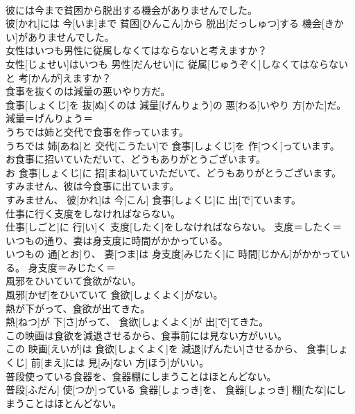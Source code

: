 \documentclass[8pt]{extreport}
\begin{document}
\begin{CJK}{UTF8}{min}
\\	彼には今まで貧困から脱出する機会がありませんでした。	
\\	彼[かれ]には 今[いま]まで 貧困[ひんこん]から 脱出[だっしゅつ]する 機会[きかい]がありませんでした。	
\\	女性はいつも男性に従属しなくてはならないと考えますか？	
\\	女性[じょせい]はいつも 男性[だんせい]に 従属[じゅうぞく]しなくてはならないと 考[かんが]えますか？	
\\	食事を抜くのは減量の悪いやり方だ。	
\\	食事[しょくじ]を 抜[ぬ]くのは 減量[げんりょう]の 悪[わる]いやり 方[かた]だ。	減量＝げんりょう＝ 
\\	うちでは姉と交代で食事を作っています。	
\\	うちでは 姉[あね]と 交代[こうたい]で 食事[しょくじ]を 作[つく]っています。	
\\	お食事に招いていただいて、どうもありがとうございます。	
\\	お 食事[しょくじ]に 招[まね]いていただいて、どうもありがとうございます。	
\\	すみません、彼は今食事に出ています。	
\\	すみません、 彼[かれ]は 今[こん] 食事[しょくじ]に 出[で]ています。	
\\	仕事に行く支度をしなければならない。	
\\	仕事[しごと]に 行[い]く 支度[したく]をしなければならない。	支度＝したく＝ 
\\	いつもの通り、妻は身支度に時間がかかっている。	
\\	いつもの 通[とお]り、 妻[つま]は 身支度[みじたく]に 時間[じかん]がかかっている。	身支度＝みじたく＝ 
\\	風邪をひいていて食欲がない。	
\\	風邪[かぜ]をひいていて 食欲[しょくよく]がない。	
\\	熱が下がって、食欲が出てきた。	
\\	熱[ねつ]が 下[さ]がって、 食欲[しょくよく]が 出[で]てきた。	
\\	この映画は食欲を減退させるから、食事前には見ない方がいい。	
\\	この 映画[えいが]は 食欲[しょくよく]を 減退[げんたい]させるから、 食事[しょくじ] 前[まえ]には 見[み]ない 方[ほう]がいい。	
\\	普段使っている食器を、食器棚にしまうことはほとんどない。	
\\	普段[ふだん] 使[つか]っている 食器[しょっき]を、 食器[しょっき] 棚[たな]にしまうことはほとんどない。	

\end{CJK}
\end{document}
